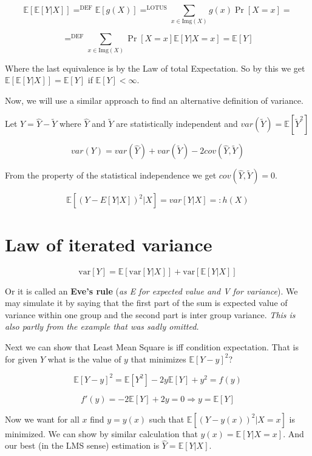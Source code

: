 $$
\mathbb{E}[\mathbb{E}[Y \vert X]] =^{\text{DEF}} \mathbb{E}[g(X)] =^{\text{LOTUS}} \sum_{x \in \text{Img}(X)}g(x) \Pr[X = x] =
$$

$$
=^{\text{DEF}} \sum_{x \in \text{Img}(X)}\Pr[X=x] \mathbb{E} [Y \vert X =x] = \mathbb{E}[Y]
$$

Where the last equivalence is by the Law of total Expectation. So by this we get $\mathbb{E}[\mathbb{E}[Y \vert X]] = \mathbb{E}[Y]$ if $\mathbb{E}[Y] < \infty$.

Now, we will use a similar approach to find an alternative definition of variance.

Let $Y = \hat{Y} - \tilde{Y}$ where $\hat{Y}$ and $\tilde{Y}$ are statistically independent and $var(\tilde{Y}) = \mathbb{E}[\tilde{Y}^2]$

$$
var(Y) = var(\hat{Y}) + var(\tilde{Y}) - 2cov(\hat{Y}, \tilde{Y})
$$

From the property of the statistical independence we get $cov(\hat{Y}, \tilde{Y}) = 0$.

$$
\mathbb{E} [(Y - E[Y\vert X])^2 \vert X] = var[Y \vert X] =: h(X)
$$

\section{Law of iterated variance}

$$
\text{var} [Y] = \mathbb{E}[\text{var}[Y \vert X]] + \text{var}[\mathbb{E}[Y \vert X]]
$$

Or it is called an \textbf{Eve's rule} (\textit{as E for expected value and V for variance}). We may simulate it by saying that the first part of the sum is expected value of variance within one group and the second part is inter group variance. \textit{This is also partly from the example that was sadly omitted.}

Next we can show that Least Mean Square is iff condition expectation. That is for given $Y$ what is the value of $y$ that minimizes $\mathbb{E}[Y - y]^{2}$?

$$
\mathbb{E}[Y - y]^{2} = \mathbb{E}[Y^{2}] - 2y\mathbb{E}[Y] + y^{2} = f(y)
$$

$$
f'(y) = - 2 \mathbb{E}[Y] + 2y = 0 \Rightarrow y = \mathbb{E}[Y]
$$

Now we want for all $x$ find $y = y(x)$ such that $\mathbb{E}[(Y - y(x))^{2} \vert X = x]$ is minimized. We can show by similar calculation that $y(x) = \mathbb{E}[Y \vert X =x ]$. And our best (in the LMS sense) estimation is $\hat{Y} = \mathbb{E} [Y \vert X]$.
